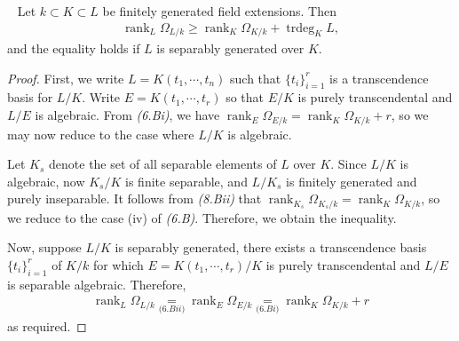 \documentclass[11pt,a4paper,footinclude=true,headinclude=true]{scrbook} %
\DeclareMathOperator{\trdeg}{trdeg}
\DeclareMathOperator{\rank}{rank}
\newcommand{\<}{\langle}
\newcommand{\>}{\rangle}
\newenvironment{proposition}[2][]
{\renewcommand\theinnercustomprop{#2}\innercustomprop[#1] 
\begin{mdframed}[backgroundcolor=gray!20]\ }
{\end{mdframed}\endinnercustomprop}
\begin{document}
\begin{proposition}{8.C}
    Let $k\subset K\subset L$ be finitely generated field extensions. Then
    \begin{align*}
        \rank_L\Omega_{L/k}\geq\rank_K\Omega_{K/k}+\trdeg_KL,
    \end{align*}
    and the equality holds if $L$ is separably generated over $K$.
\end{proposition}
\begin{proof}
    First, we write $L=K(t_1,\cdots,t_n)$ such that $\{t_i\}_{i=1}^r$ is a transcendence basis for $L/K$. Write $E=K(t_1,\cdots,t_r)$ so that $E/K$ is purely transcendental and $L/E$ is algebraic. From \textit{(6.Bi)}, we have $\rank_E\Omega_{E/k}=\rank_K\Omega_{K/k}+r$, so we may now reduce to the case where $L/K$ is algebraic.
    
    Let $K_s$ denote the set of all separable elements of $L$ over $K$. Since $L/K$ is algebraic, now $K_s/K$ is finite separable, and $L/K_s$ is finitely generated and purely inseparable. It follows from \textit{(8.Bii)} that $\rank_{K_s}\Omega_{K_s/k}=\rank_K\Omega_{K/k}$, so we reduce to the case (iv) of \textit{(6.B)}. Therefore, we obtain the inequality.
    
    Now, suppose $L/K$ is separably generated, there exists a transcendence basis $\{t_i\}_{i=1}^r$ of $K/k$ for which $E=K(t_1,\cdots,t_r)/K$ is purely transcendental and $L/E$ is separable algebraic. Therefore, 
    \begin{align*}
        \rank_L\Omega_{L/k}\underset{\textit{(6.Bii)}}{=}\rank_E\Omega_{E/k}\underset{\textit{(6.Bi)}}{=}\rank_K\Omega_{K/k}+r
    \end{align*}
    as required.
\end{proof}
\end{document}
